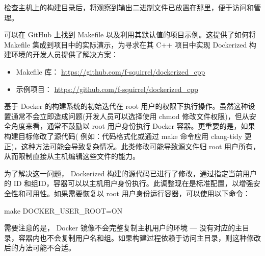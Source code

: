检查主机上的构建目录后，将观察到输出二进制文件已放置在那里，便于访问和管理。

可以在 GitHub 上找到 Makefile 以及利用其默认值的项目示例。这提供了如何将 Makefile 集成到项目中的实际演示，为寻求在其 C++ 项目中实现 Dockerized 构建环境的开发人员提供了解决方案：

\begin{itemize}
\item
Makefile 库： \url{https://github.com/f-squirrel/dockerized_cpp}

\item
示例项目： \url{https://github.com/f-squirrel/dockerized_cpp}
\end{itemize}


基于 Docker 的构建系统的初始迭代在 root 用户的权限下执行操作。虽然这种设置通常不会立即造成问题(开发人员可以选择使用 chmod 修改文件权限)，但从安全角度来看，通常不鼓励以 root 用户身份执行 Docker 容器。更重要的是，如果构建目标修改了源代码( 例如：代码格式化或通过 make 命令应用 clang-tidy 更正)，这种方法可能会导致复杂情况。此类修改可能导致源文件归 root 用户所有，从而限制直接从主机编辑这些文件的能力。

为了解决这一问题， Dockerized 构建的源代码已进行了修改，通过指定当前用户的 ID 和组ID，容器可以以主机用户身份执行。此调整现在是标准配置，以增强安全性和可用性。如果需要恢复以 root 用户身份运行容器，可以使用以下命令：

\begin{shell}
make DOCKER_USER_ROOT=ON
\end{shell}

需要注意的是， Docker 镜像不会完整复制主机用户的环境 --- 没有对应的主目录，容器内也不会复制用户名和组。如果构建过程依赖于访问主目录，则这种修改后的方法可能不合适。















